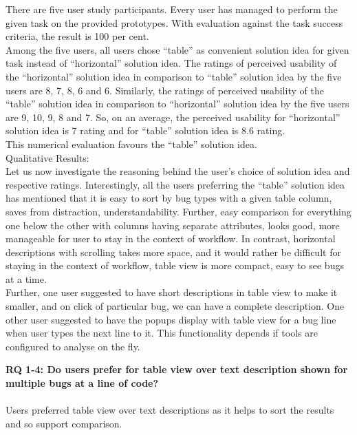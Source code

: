 There are five user study participants. Every user has managed to perform the given task on the provided prototypes. With evaluation against the task success criteria, the result is 100 per cent. \\

Among the five users, all users chose “table” as convenient solution idea for given task instead of “horizontal” solution idea. The ratings of perceived usability of the “horizontal” solution idea in comparison to “table” solution idea by the five users are 8, 7, 8, 6 and 6. Similarly, the ratings of perceived usability of the “table” solution idea in comparison to “horizontal” solution idea by the five users are 9, 10, 9, 8 and 7. So, on an average, the perceived usability for “horizontal” solution idea is 7 rating and for “table” solution idea is 8.6 rating. \\

This numerical evaluation favours the “table” solution idea. \\

Qualitative Results: \\

Let us now investigate the reasoning behind the user’s choice of solution idea and respective ratings. Interestingly, all the users preferring the “table” solution idea has mentioned that it is easy to sort by bug types with a given table column, saves from distraction, understandability. Further, easy comparison for everything one below the other with columns having separate attributes, looks good, more manageable for user to stay in the context of workflow. In contrast, horizontal descriptions with scrolling takes more space, and it would rather be difficult for staying in the context of workflow, table view is more compact, easy to see bugs at a time. \\

Further, one user suggested to have short descriptions in table view to make it smaller, and on click of particular bug, we can have a complete description. One other user suggested to have the popups display with table view for a bug line when user types the next line to it. This functionality depends if tools are configured to analyse on the fly. \\

\begin{myboxi}{{\textbf{RQ 1-4: Do users prefer for table view over text description shown for multiple bugs at a line of code?}}}
	\\ \\ Users preferred table view over text descriptions as it helps to sort the results and so support comparison. \\
\end{myboxi}

